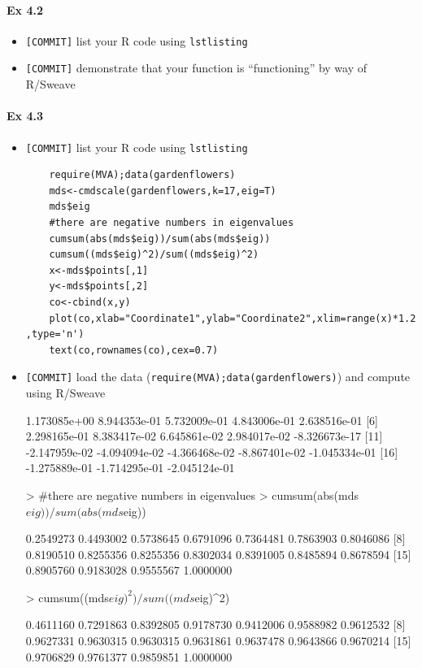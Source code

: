 \documentclass[12pt]{article}
\begin{document}
\paragraph{Ex 4.2}
\begin{itemize}
    \item \verb+[COMMIT]+ list your R code using \verb+lstlisting+ 
    \item \verb+[COMMIT]+ demonstrate that your function is ``functioning'' by way of R/Sweave
\end{itemize}

\paragraph{Ex 4.3}
\begin{itemize}
    \item \verb+[COMMIT]+ list your R code using \verb+lstlisting+ 
    \begin{lstlisting}
    require(MVA);data(gardenflowers)
    mds<-cmdscale(gardenflowers,k=17,eig=T)
    mds$eig
    #there are negative numbers in eigenvalues
    cumsum(abs(mds$eig))/sum(abs(mds$eig))
    cumsum((mds$eig)^2)/sum((mds$eig)^2)
    x<-mds$points[,1]
    y<-mds$points[,2]
    co<-cbind(x,y)
    plot(co,xlab="Coordinate1",ylab="Coordinate2",xlim=range(x)*1.2  ,type='n')
    text(co,rownames(co),cex=0.7)
    \end{lstlisting}
    \item \verb+[COMMIT]+ load the data
        (\verb+require(MVA);data(gardenflowers)+) and compute using R/Sweave
\begin{Schunk}
\begin{Soutput}
 [1]  1.173085e+00  8.944353e-01  5.732009e-01  4.843006e-01  2.638516e-01
 [6]  2.298165e-01  8.383417e-02  6.645861e-02  2.984017e-02 -8.326673e-17
[11] -2.147959e-02 -4.094094e-02 -4.366468e-02 -8.867401e-02 -1.045334e-01
[16] -1.275889e-01 -1.714295e-01 -2.045124e-01
\end{Soutput}
\begin{Sinput}
>     #there are negative numbers in eigenvalues
>     cumsum(abs(mds$eig))/sum(abs(mds$eig))
\end{Sinput}
\begin{Soutput}
 [1] 0.2549273 0.4493002 0.5738645 0.6791096 0.7364481 0.7863903 0.8046086
 [8] 0.8190510 0.8255356 0.8255356 0.8302034 0.8391005 0.8485894 0.8678594
[15] 0.8905760 0.9183028 0.9555567 1.0000000
\end{Soutput}
\begin{Sinput}
>     cumsum((mds$eig)^2)/sum((mds$eig)^2)
\end{Sinput}
\begin{Soutput}
 [1] 0.4611160 0.7291863 0.8392805 0.9178730 0.9412006 0.9588982 0.9612532
 [8] 0.9627331 0.9630315 0.9630315 0.9631861 0.9637478 0.9643866 0.9670214
[15] 0.9706829 0.9761377 0.9859851 1.0000000
\end{Soutput}
\end{Schunk}


\end{itemize}
\end{document}
